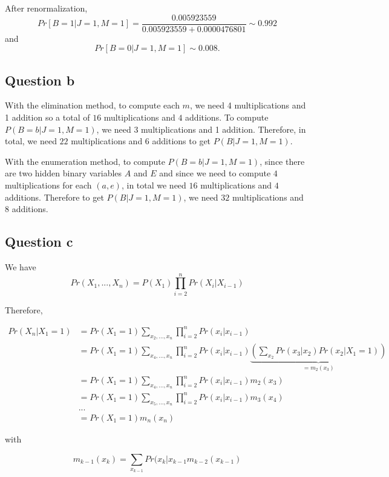 \documentclass{article}
\begin{document}
After renormalization,
$$Pr[B=1|J=1, M=1]= \frac{0.005923559}{0.005923559+ 0.0000476801}\sim 0.992$$
and 
$$Pr[B=0|J=1, M=1] \sim 0.008.$$

\subsection{Question b}
With the elimination method, to compute each $m$, we need 4 multiplications and 1 addition so a total of $16$ multiplications and $4$ additions. To compute $P(B=b|J=1, M=1)$, we need 3 multiplications and 1 addition. Therefore, in total, we need $22$ multiplications and $6$ additions to get $P(B|J=1, M=1)$. 

With the enumeration method, to compute $P(B=b|J=1, M=1)$, since there are two hidden binary variables $A$ and $E$ and since we need to compute $4$ multiplications for each $(a,e)$, in total we need $16$ multiplications and $4$ additions. Therefore to get  $P(B|J=1, M=1)$, we need $32$ multiplications and $8$ additions. 

\subsection{Question c}
We have 
\begin{equation}
Pr(X_{1}, ..., X_{n}) = P(X_{1})\prod_{i=2}^{n}Pr(X_{i}|X_{i-1})
\end{equation}

Therefore, 

\begin{equation}
\begin{split}
Pr(X_{n}|X_{1}=1) &= Pr(X_{1}=1)\displaystyle\sum_{x_{2}, ..., x_{n}}\prod_{i=2}^{n}Pr(x_{i}|x_{i-1}) \\
& =Pr(X_{1}=1)\displaystyle\sum_{x_{4}, ..., x_{n}}\prod_{i=2}^{n}Pr(x_{i}|x_{i-1})\underbrace{\left(\displaystyle\sum_{x_{2}}Pr(x_{3}|x_{2})Pr(x_{2}|X_{1}=1) \right)}_{=m_{2}(x_{3})}\\
& =Pr(X_{1}=1)\displaystyle\sum_{x_{4}, ..., x_{n}}\prod_{i=2}^{n}Pr(x_{i}|x_{i-1})m_{2}(x_{3})\\
& =Pr(X_{1}=1)\displaystyle\sum_{x_{5}, ..., x_{n}}\prod_{i=2}^{n}Pr(x_{i}|x_{i-1})m_{3}(x_{4})\\
& ... \\
& =Pr(X_{1}=1)m_{n}(x_{n})
\end{split} 
\end{equation}

with 

$$m_{k-1}(x_{k})= \displaystyle\sum_{x_{k-1}} Pr(x_{k}|x_{k-1}m_{k-2}(x_{k-1})$$
\end{document}
